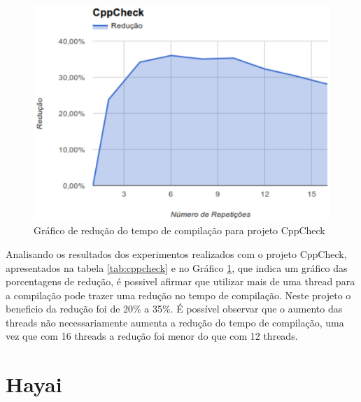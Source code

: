 \begin{figure}[h]
    \centering
        \includegraphics[keepaspectratio=true,scale=1]{figuras/cppcheck.eps}
    \caption{Gráfico de redução do tempo de compilação para projeto CppCheck}
    \label{cppcheck}
\end{figure}

Analisando os resultados dos experimentos realizados com o projeto
 CppCheck, apresentados na tabela \ref{tab:cppcheck} e no Gráfico \ref{cppcheck},
 que indica um gráfico das porcentagens de redução, é
 possivel afirmar que utilizar mais de uma thread para a
 compilação pode trazer uma redução no tempo de compilação.
 Neste projeto o beneficio da redução foi de 20\% a 35\%.
 É possível observar que o aumento das threads  não
 necessariamente aumenta a redução do tempo de compilação,
 uma vez que com 16 threads  a redução foi menor  do que com 12 threads.



\section{Hayai}


